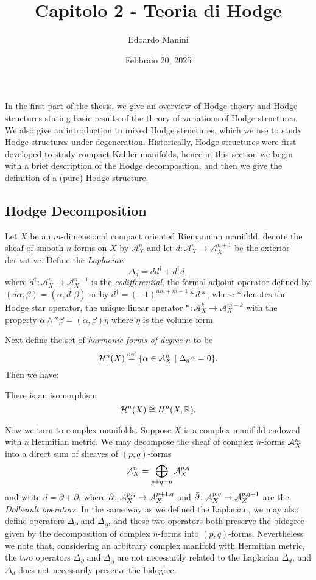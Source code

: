 \documentclass[../main.tex]{subfiles}
\title{Capitolo 2 - Teoria di Hodge}
\author{Edoardo Manini}
\date{Febbraio 20, 2025}
\begin{document}
\ifSubfilesClassLoaded{
\maketitle
\tableofcontents
}{}


In the first part of the thesis, we give an overview of Hodge thoery and Hodge structures stating basic results of the theory of variations of Hodge structures. We also give an introduction to mixed Hodge structures, which we use to study Hodge structures under degeneration.
Historically, Hodge structures were first developed to study compact Kähler manifolds, hence in this section we begin with a brief description of the Hodge decomposition, and then we give the definition of a (pure) Hodge structure.
\subsection{Hodge Decomposition}

Let $X$ be an $m$-dimensional compact oriented Riemannian manifold, denote the sheaf of smooth $n$-forms on $X$ by $\mathcal{A}^n_X$ and let $d\colon \mathcal{A}^n_X \to \mathcal{A}^{n+1}_X$ be the exterior derivative. Define the \emph{Laplacian}
\[\Delta_d = dd^\dag + d^\dag d,\]
where $d^\dag\colon \mathcal{A}^n_X \to \mathcal{A}^{n-1}_X$ is the \emph{codifferential}, the formal adjoint operator defined by $(d\alpha,\beta)=(\alpha,d^\dag\beta)$ or by $d^\dag = (-1)^{nm+m+1}*d*$, where $*$ denotes the Hodge star operator, the unique linear operator $*\colon \mathcal{A}^k_X \to \mathcal{A}^{m-k}_X$ with the property $\alpha\wedge*\beta=(\alpha,\beta)\eta$ where $\eta$ is the volume form.

Next define the set of \emph{harmonic forms of degree $n$} to be
\[\mathcal{H}^n(X) \stackrel{\text{def}}{=} \{\alpha \in \mathcal{A}^n_X \mid \Delta_d\alpha = 0\}.\]
Then we have:

\begin{theorem}  \textup{\cite[Thm. 5.23]{Voi07}} There is an isomorphism
\[\mathcal{H}^n(X) \cong H^n(X,\mathbb{R}).\]
\end{theorem}


Now we turn to complex manifolds. Suppose $X$ is a complex manifold endowed with a Hermitian metric. We may decompose the sheaf of complex $n$-forms $\mathcal{A}^n_X$ into a direct sum of sheaves of $(p,q)$-forms
\[
\mathcal{A}^n_X = \bigoplus_{p+q=n} \mathcal{A}^{p,q}_X
\]
and write $d = \partial + \bar {\partial}$, where $\partial\colon \mathcal{A}^{p,q}_X \to \mathcal{A}^{p+1,q}_X$ and $\bar {\partial}\colon \mathcal{A}^{p,q}_X \to \mathcal{A}^{p,q+1}_X$ are the \emph{Dolbeault operators}. In the same way as we defined the Laplacian, we may also define operators $\Delta_{\partial}$ and $\Delta_{\overline{\partial}}$, and these two operators both preserve the bidegree given by the decomposition of complex $n$-forms into $(p,q)$-forms. 
Nevertheless we note that, considering an arbitrary complex manifold with Hermitian metric, the two operators $\Delta_{\partial}$ and $\Delta_{\overline{\partial}}$ are not necessarily related to the Laplacian $\Delta_d$, and $\Delta_d$ does not necessarily preserve the bidegree. 
\end{document}
